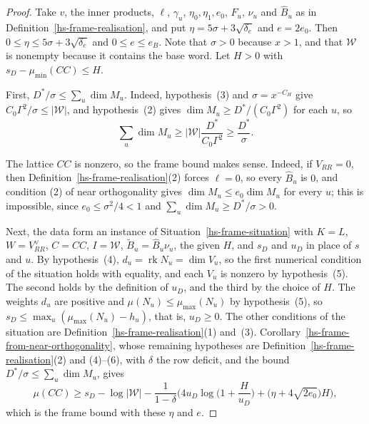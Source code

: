 \begin{proof}
Take $v$, the inner products, $\ell$, $\gamma_u$, $\eta_0,\eta_1,e_0$, $F_u$, $\nu_u$ and
$\hat B_u$ as in Definition~\ref{hs-frame-realisation}, and put $\eta=5\sigma+3\sqrt{\delta_e}$
and $e=2e_0$. Then $0\leq\eta\leq5\sigma+3\sqrt{\delta_e}$ and $0\leq e\leq e_B$. Note that
$\sigma>0$ because $x>1$, and that $\mathcal W$ is nonempty because it contains the base word.
Let $H>0$ with $s_D-\mu_{\min}(CC)\leq H$.

First, $D^*/\sigma\leq\sum_u\dim M_u$. Indeed, hypothesis~(3) and $\sigma=x^{-C_H}$ give
$C_0\Gamma^2/\sigma\leq|\mathcal W|$, and hypothesis~(2) gives
$\dim M_u\geq D^*/(C_0\Gamma^2)$ for each $u$, so
\[
 \sum_u\dim M_u\geq|\mathcal W|\frac{D^*}{C_0\Gamma^2}\geq\frac{D^*}{\sigma}.
\]

The lattice $CC$ is nonzero, so the frame bound makes sense. Indeed, if $V_{RR}=0$, then
Definition~\ref{hs-frame-realisation}(2) forces $\ell=0$, so every $\hat B_u$ is $0$, and
condition (2) of near orthogonality gives $\dim M_u\leq e_0\dim M_u$ for every $u$; this is
impossible, since $e_0\leq\sigma^2/4<1$ and $\sum_u\dim M_u\geq D^*/\sigma>0$.

Next, the data form an instance of Situation~\ref{hs-frame-situation} with $K=L$,
$W=V_{RR}^\vee$, $C=CC$, $I=\mathcal W$, $\tilde B_u=\hat B_u\nu_u$, the given $H$, and $s_D$ and
$u_D$ in place of $s$ and $u$. By hypothesis~(4), $d_u=\operatorname{rk}N_u=\dim V_u$, so the first
numerical condition of the situation holds with equality, and each $V_u$ is nonzero by
hypothesis~(5). The second holds by the definition of $u_D$, and the third by the choice of $H$.
The weights $d_u$ are positive and $\mu(N_u)\leq\mu_{\max}(N_u)$ by
hypothesis~(5), so $s_D\leq\max_u(\mu_{\max}(N_u)-h_u)$, that is, $u_D\geq0$. The other
conditions of the situation are Definition~\ref{hs-frame-realisation}(1) and~(3).
Corollary~\ref{hs-frame-from-near-orthogonality}, whose remaining hypotheses are
Definition~\ref{hs-frame-realisation}(2) and (4)--(6), with $\delta$ the row deficit, and the bound
$D^*/\sigma\leq\sum_u\dim M_u$, gives
\[
 \mu(CC)\geq s_D-\log|\mathcal W|-\frac1{1-\delta}
 \Big(4u_D\log\Big(1+\frac H{u_D}\Big)+\big(\eta+4\sqrt{2e_0}\big)H\Big),
\]
which is the frame bound with these $\eta$ and $e$.
\end{proof}
